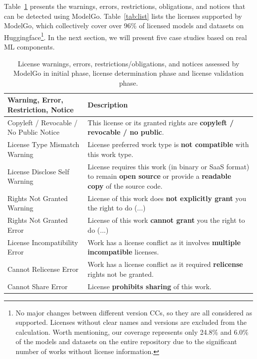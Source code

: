 Table~\ref{tab:analysis} presents the warnings, errors, restrictions, obligations, and notices that can be detected using ModelGo.
Table~\ref{tab:list} lists the licenses supported by ModelGo, which collectively cover over 96\% of licensed models and datasets on Huggingface\footnote{No major changes between different version CCs, so they are all considered as supported. Licenses without clear names and versions are excluded from the calculation. Worth mentioning, our coverage represents only 24.8\% and 6.0\% of the models and datasets on the entire repository due to the significant number of works without license information.}.
In the next section, we will present five case studies based on real ML components.


\begin{table}[t]
    \caption{License warnings, errors, restrictions/obligations, and notices assessed by ModelGo in \textcolor{Permissive}{initial phase}, \textcolor{Copyleft}{license determination phase} and license validation phase.}
    \scriptsize
    \label{tab:analysis}
    \begin{tabular}{|p{3.3cm}|p{4.3cm}|}

    \hline
    \rowcolor[gray]{.8}
    \textbf{Warning, Error, Restriction, Notice} & \textbf{Description} \\ \hline
    
    \textcolor{Permissive}{Copyleft / Revocable / No Public Notice} & This license or its granted rights are \textbf{copyleft / revocable / no public}. \\ \hline \hline
    
    \textcolor{Permissive}{License Type Mismatch Warning} & License preferred work type is \textbf{not compatible} with this work type. \\ \hline
    License Disclose Self Warning & License requires this work (in binary or SaaS format) to remain \textbf{open source} or provide a \textbf{readable copy} of the source code. \\ \hline
    Rights Not Granted Warning & License of this work does \textbf{not explicitly grant} you the right to do (...) \\ \hline \hline
    
    
    Rights Not Granted Error & License of this work \textbf{cannot grant} you the right to do (...) \\ \hline
    \textcolor{Copyleft}{License Incompatibility Error} & Work has a license conflict as it involves \textbf{multiple incompatible} licenses. \\ \hline
    \textcolor{Copyleft}{Cannot Relicense Error} & Work has a license conflict as it required \textbf{relicense} rights not be granted. \\ \hline
    Cannot Share Error & License \textbf{prohibits sharing} of this work. \\ \hline \hline


\end{tabular}
\end{table}
